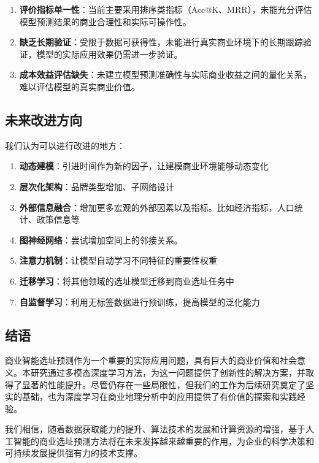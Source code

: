 \documentclass{article}
\begin{document}
\begin{enumerate}
\item \textbf{评价指标单一性}：当前主要采用排序类指标（Acc@K、MRR），未能充分评估模型预测结果的商业合理性和实际可操作性。

\item \textbf{缺乏长期验证}：受限于数据可获得性，未能进行真实商业环境下的长期跟踪验证，模型的实际应用效果仍需进一步验证。

\item \textbf{成本效益评估缺失}：未建立模型预测准确性与实际商业收益之间的量化关系，难以评估模型的真实商业价值。
\end{enumerate}

\subsection{未来改进方向}

我们认为可以进行改进的地方：

\begin{enumerate}
\item \textbf{动态建模}：引进时间作为新的因子，让建模商业环境能够动态变化
\item \textbf{层次化架构}：品牌类型增加、子网络设计
\item \textbf{外部信息融合}：增加更多宏观的外部因素以及指标。比如经济指标，人口统计、政策信息等
\item \textbf{图神经网络}：尝试增加空间上的邻接关系。
\item \textbf{注意力机制}：让模型自动学习不同特征的重要性权重
\item \textbf{迁移学习}：将其他领域的选址模型迁移到商业选址任务中
\item \textbf{自监督学习}：利用无标签数据进行预训练，提高模型的泛化能力
\end{enumerate}

\subsection{结语}

商业智能选址预测作为一个重要的实际应用问题，具有巨大的商业价值和社会意义。本研究通过多模态深度学习方法，为这一问题提供了创新性的解决方案，并取得了显著的性能提升。尽管仍存在一些局限性，但我们的工作为后续研究奠定了坚实的基础，也为深度学习在商业地理分析中的应用提供了有价值的探索和实践经验。

我们相信，随着数据获取能力的提升、算法技术的发展和计算资源的增强，基于人工智能的商业选址预测方法将在未来发挥越来越重要的作用，为企业的科学决策和可持续发展提供强有力的技术支撑。
\end{document}
